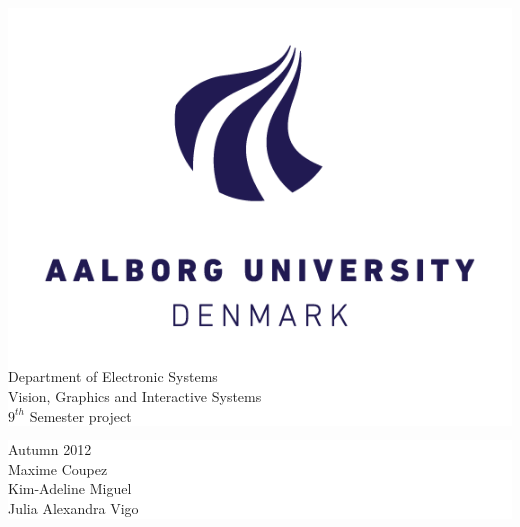 \begin{titlepage}
{	\noindent \colorbox{white}{
		\begin{minipage}[b]{6.5cm}
			\includegraphics{figures/aau_new_logo} \\
			{\small Department of Electronic Systems} \\
			{\small Vision, Graphics and Interactive Systems}  \\
			{\small $9^{th}$ Semester project}
		\end{minipage}
	} 
	\hfill  
	\colorbox{white}{ 
		\begin{minipage}[b]{3.5cm}	 
			\flushright
			{\large Autumn 2012} \\
			{\small Maxime Coupez}\\
			{\small Kim-Adeline Miguel}\\
			{\small Julia Alexandra Vigo}
		\end{minipage}
	}
	}
\end{titlepage}
\clearpage
